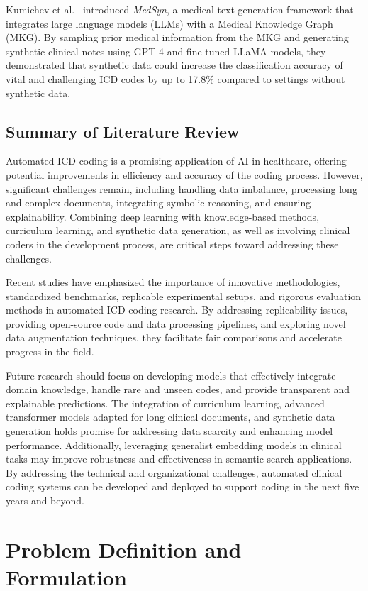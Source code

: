 \documentclass[12pt,a4paper]{report}
\begin{document}
Kumichev et al.~\cite{kumichev2024medsyn} introduced \textit{MedSyn}, a medical text generation framework that integrates large language models (LLMs) with a Medical Knowledge Graph (MKG). By sampling prior medical information from the MKG and generating synthetic clinical notes using GPT-4 and fine-tuned LLaMA models, they demonstrated that synthetic data could increase the classification accuracy of vital and challenging ICD codes by up to 17.8\% compared to settings without synthetic data.

\section{Summary of Literature Review}

Automated ICD coding is a promising application of AI in healthcare, offering potential improvements in efficiency and accuracy of the coding process. However, significant challenges remain, including handling data imbalance, processing long and complex documents, integrating symbolic reasoning, and ensuring explainability. Combining deep learning with knowledge-based methods, curriculum learning, and synthetic data generation, as well as involving clinical coders in the development process, are critical steps toward addressing these challenges.

Recent studies have emphasized the importance of innovative methodologies, standardized benchmarks, replicable experimental setups, and rigorous evaluation methods in automated ICD coding research. By addressing replicability issues, providing open-source code and data processing pipelines, and exploring novel data augmentation techniques, they facilitate fair comparisons and accelerate progress in the field.

Future research should focus on developing models that effectively integrate domain knowledge, handle rare and unseen codes, and provide transparent and explainable predictions. The integration of curriculum learning, advanced transformer models adapted for long clinical documents, and synthetic data generation holds promise for addressing data scarcity and enhancing model performance. Additionally, leveraging generalist embedding models in clinical tasks may improve robustness and effectiveness in semantic search applications. By addressing the technical and organizational challenges, automated clinical coding systems can be developed and deployed to support coding in the next five years and beyond.

\chapter{Problem Definition and Formulation}
\end{document}
